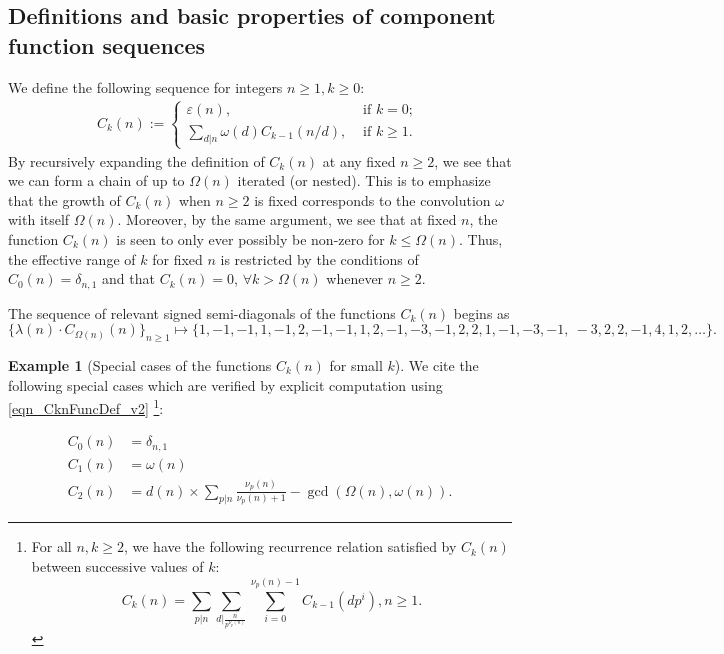 \documentclass[11pt,reqno,a4letter]{article}
\numberwithin{figure}{section}
\numberwithin{table}{section}
\newcommand{\seqnum}[1]{\href{http://oeis.org/#1}{\color{ProcessBlue}{\underline{#1}}}}
\theoremstyle{plain}
\numberwithin{theorem}{section}
\theoremstyle{definition}
\newtheorem{example}[theorem]{Example}
\newcommand{\NBRef}[1]{}
\begin{document}
\subsection{Definitions and basic properties of component function sequences} 

We define the following sequence for integers $n \geq 1, k \geq 0$: 
\begin{align} 
\label{eqn_CknFuncDef_v2} 
C_k(n) := \begin{cases} 
     \varepsilon(n), & \text{ if $k = 0$; } \\ 
     \sum\limits_{d|n} \omega(d) C_{k-1}(n/d), & \text{ if $k \geq 1$. } 
     \end{cases} 
\end{align} 
By recursively expanding the definition of $C_k(n)$ 
at any fixed $n \geq 2$, we see that 
we can form a chain of up to $\Omega(n)$ iterated (or nested). 
This is to emphasize that the 
growth of $C_k(n)$ when $n \geq 2$ is fixed corresponds to the convolution 
$\omega$ with itself $\Omega(n)$. 
Moreover, by the same argument, we see that at fixed $n$, the function 
$C_k(n)$ is seen to only ever possibly be non-zero for $k \leq \Omega(n)$. 
Thus, the effective range of $k$ for fixed $n$ is restricted by the 
conditions of $C_0(n) = \delta_{n,1}$ and that $C_k(n) = 0$, $\forall k > \Omega(n)$ 
whenever $n \geq 2$. 

The sequence of relevant signed semi-diagonals of the functions $C_k(n)$ begins as 
\cite[\seqnum{A008480}]{OEIS} 
\[
\{\lambda(n) \cdot C_{\Omega(n)}(n) \}_{n \geq 1} \mapsto \{
     1, -1, -1, 1, -1, 2, -1, -1, 1, 2, -1, -3, -1, 2, 2, 1, -1, -3, -1, \
     -3, 2, 2, -1, 4, 1, 2, \ldots \}. 
\]

\begin{example}[Special cases of the functions $C_k(n)$ for small $k$] 
\label{example_SpCase_Ckn} 
We cite the following special cases which are verified by 
explicit computation using \eqref{eqn_CknFuncDef_v2} 
\cite[\seqnum{A066922}]{OEIS}\footnote{ 
     For all $n,k \geq 2$, we have the following recurrence 
     relation satisfied by $C_k(n)$ between successive values of $k$: 
     \begin{equation*}
     C_k(n) = \sum_{p|n} \sum_{d\rvert\frac{n}{p^{\nu_p(n)}}} \sum_{i=0}^{\nu_p(n)-1} 
          C_{k-1}\left(dp^i\right), n \geq 1. 
     \end{equation*}
}: 
\NBRef{A07-2020-04-26} 
\begin{align*} 
C_0(n) & = \delta_{n,1} \\ 
C_1(n) & = \omega(n) \\ 
C_2(n) & = d(n) \times \sum_{p|n} \frac{\nu_p(n)}{\nu_p(n)+1} - \gcd\left(\Omega(n), \omega(n)\right). 
\end{align*} 
\end{example} 
\end{document}
